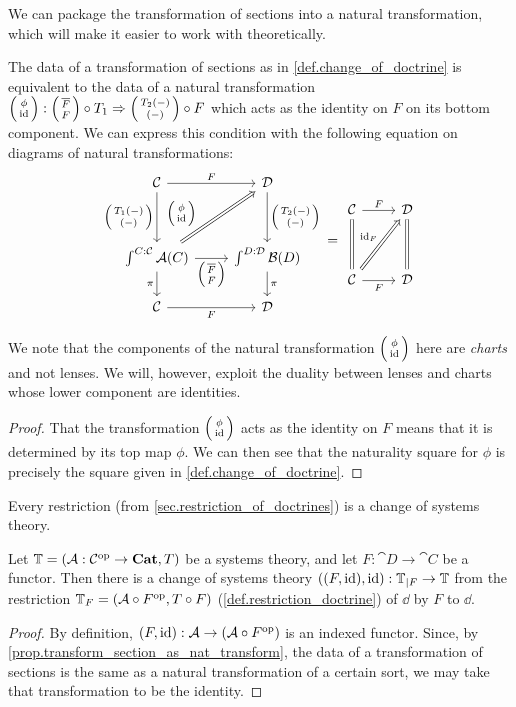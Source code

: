 \documentclass[DynamicalBook]{subfiles}
\begin{document}
We can package the transformation of sections into a natural transformation,
which will make it easier to work with theoretically.
\begin{proposition}\label{prop.transform_section_as_nat_transform}
The data of a transformation of sections as in \cref{def.change_of_doctrine} is equivalent to the data
of a natural transformation $\lens{\phi}{\id} : \lens{\overline{F}}{F} \circ T_1
    \Rightarrow \lens{T_2(-)}{(-)} \circ F$ which acts as the identity on $F$ on
    its bottom component. We can express this condition with the following equation on
    diagrams of natural transformations: 
    \[
\begin{tikzcd}
  \cat{C} \ar[dd,"{\lens{T_1(-)}{(-)}}"'] \ar[r, "F"] & \cat{D} \ar[dd,
  "{\lens{T_2(-)}{(-)}}"] \\
  & \\
\int^{C : \cat{C}}\cat{A}(C) \ar[r, "\lens{\overline{F}}{F}"'] \ar[uur,
Rightarrow, "{\lens{\phi}{\id}}" near start] \ar[d,"\pi"'] & \int^{D :
  \cat{D}} \cat{B}(D) \ar[d, "\pi"]\\
\cat{C} \ar[r, "F"'] & \cat{D}
\end{tikzcd} 
=
\begin{tikzcd}
  \cat{C} \ar[dd, equals] \ar[r, "F"] & \cat{D} \ar[dd, equals] \\
  & \\
\cat{C} \ar[r, "F"'] \ar[uur, Rightarrow, "\id_F"] & \cat{D}
\end{tikzcd}
\]
\end{proposition}
\begin{remark}
  We note that the components of the natural transformation $\lens{\phi}{\id}$
  here are \emph{charts} and not lenses. We will, however, exploit the duality
  between lenses and charts whose lower component are identities.
\end{remark}
\begin{proof}
  That the transformation $\lens{\phi}{\id}$ acts as the identity on $F$ means
  that it is determined by its top map $\phi$. We can then see that the
  naturality square for $\phi$ is precisely the square given in \cref{def.change_of_doctrine}.
\end{proof}


Every restriction (from \cref{sec.restriction_of_doctrines}) is a change of systems theory.
\begin{proposition}
Let $\mathbb{T} = (\mathcal{A} : \mathcal{C}^{\textnormal{op}} \to \textbf{Cat}, T)$ be a systems theory, and let $F :
\cat{D} \to \cat{C}$ be a functor. Then there is a change of systems theory $((F,
\mathrm{id}), \mathrm{id}) : \mathbb{T}_{|F} \to \mathbb{T}$ from the restriction $\mathbb{T}_F = (\mathcal{A} \circ
F^{\textnormal{op}}, T \circ F)$ (\cref{def.restriction_doctrine}) of $\dd$ by $F$ to $\dd$.
\end{proposition}
\begin{proof}
By definition, $(F, \mathrm{id}) : \mathcal{A} \to (\mathcal{A} \circ F^{\textnormal{op}})$ is an indexed
functor. Since, by \cref{prop.transform_section_as_nat_transform}, the data of a
transformation of sections is the same as a natural transformation of a certain
sort, we may take that transformation to be the identity.
\end{proof}
\end{document}
